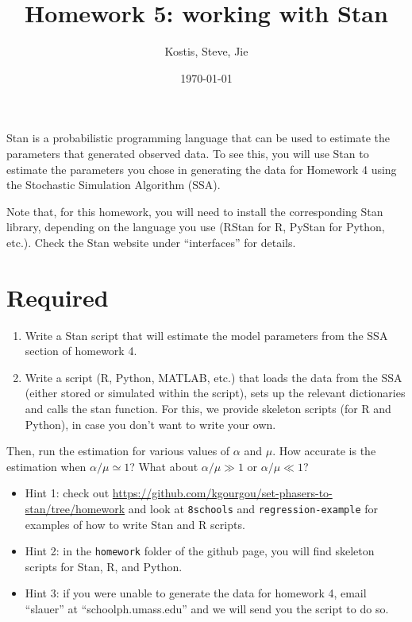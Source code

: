 \documentclass{article}\usepackage[]{graphicx}\usepackage[]{color}
\title{Homework 5: working with Stan}
\author{Kostis, Steve, Jie}
\date{\today}
\begin{document}
\maketitle

Stan is a probabilistic programming language that can be used to estimate the parameters that generated observed data. To see this, you will use Stan to estimate the parameters you chose in generating the data for Homework 4 using the Stochastic Simulation Algorithm (SSA).

Note that, for this homework, you will need to install the corresponding Stan
library, depending on the language you use (RStan for R, PyStan for Python,
etc.). Check the Stan website under ``interfaces'' for details. 

\section{Required}

\begin{enumerate}
    \item Write a Stan script that will estimate the model parameters from the SSA section of homework 4.
    \item Write a script (R, Python, MATLAB, etc.) that loads the data from the
      SSA (either stored or simulated within the script), sets up the relevant
      dictionaries and calls the stan function. For this, we provide skeleton
      scripts (for R and Python), in case you don't want to write your own. 
\end{enumerate}

Then, run the estimation for various values of $\alpha$ and $\mu$. How accurate
is the estimation when $\alpha/\mu\simeq 1$?  What about $\alpha/\mu\gg 1$ or
$\alpha/\mu\ll 1$?

\begin{itemize}
\item Hint 1: check out \url{https://github.com/kgourgou/set-phasers-to-stan/tree/homework} and look at {\tt 8schools} and {\tt regression-example} for examples of how to write Stan and R scripts.

\item Hint 2: in the {\tt homework} folder of the github page, you will find skeleton scripts for Stan, R, and Python.

\item Hint 3: if you were unable to generate the data for homework 4, email ``slauer'' at ``schoolph.umass.edu'' and we will send you the script to do so.
\end{itemize}
\end{document}
